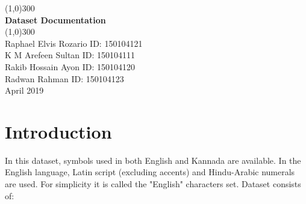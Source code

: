 \documentclass{article}
\begin{document}
\begin{titlepage}
\begin{center}
\line(1,0){300}\\
[0.25in]
\huge{\bfseries Dataset Documentation}\\
[0.25in]
\line(1,0){300}\\
[1.25in]
Raphael Elvis Rozario ID: 150104121\\
K M Arefeen Sultan ID: 150104111\\
Rakib Hossain Ayon ID: 150104120\\
Radwan Rahman ID: 150104123\\
[0.25in]
April 2019
\end{center}
\end{titlepage}
\section{Introduction}
In this dataset\cite{Chars74k:2009}, symbols used in both English and Kannada are available. In the English language, Latin script (excluding accents) and Hindu-Arabic numerals are used. For simplicity it is called the "English" characters set. Dataset consists of:
\end{document}
